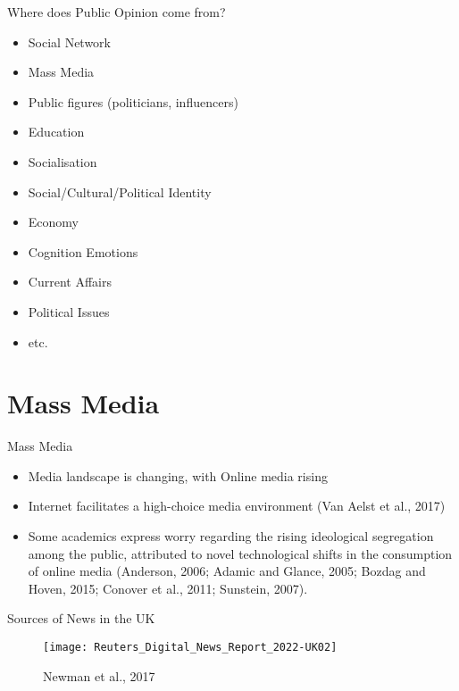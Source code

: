 \documentclass{beamer}
\begin{document}
\begin{frame}{Where does Public Opinion come from?}
    \begin{itemize}
        \item Social Network 
        \item Mass Media 
        \item Public figures (politicians, influencers) 
        \item Education 
        \item Socialisation
        \item Social/Cultural/Political Identity 
        \item Economy 
        \item Cognition 
        \itme Emotions 
        \item Current Affairs 
        \item Political Issues 
        \item etc. 
    \end{itemize} 
\end{frame}







\section{Mass Media}

\begin{frame}{Mass Media}
\begin{itemize}
    \item Media landscape is changing, with Online media rising 
    \item Internet facilitates a high-choice media environment (Van Aelst et al., 2017)
    \item Some academics express worry regarding the rising ideological segregation among the public, attributed to novel technological shifts in the consumption of online media (Anderson, 2006; Adamic and Glance, 2005; Bozdag and Hoven, 2015; Conover et al., 2011; Sunstein, 2007).
\end{itemize}
\end{frame}

\begin{frame}{Sources of News in the UK}
    \begin{figure}
        \centering
        \texttt{[image: Reuters\_Digital\_News\_Report\_2022-UK02]}
        \caption{Newman et al., 2017}
        \label{fig:1}
    \end{figure}
\end{frame}
\end{document}
